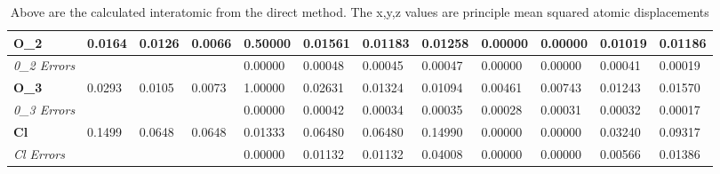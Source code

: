 \documentclass[]{scrartcl}
\begin{document}
\begin{table}[]
\begin{tabular}{|l|l|l|l|l|l|l|l|l|l|l|l|}
		\textbf{O\_2}                         & 0.0164                          & 0.0126                          & 0.0066                          & 0.50000                           & 0.01561                           & 0.01183                           & 0.01258                           & 0.00000                           & 0.00000                           & 0.01019                           & 0.01186                           \\ \hline
		\textit{0\_2 Errors}                           &                                 &                                 &                                 & 0.00000                           & 0.00048                           & 0.00045                           & 0.00047                           & 0.00000                           & 0.00000                           & 0.00041                           & 0.00019                           \\ \hline
		\textbf{O\_3}                         & 0.0293                          & 0.0105                          & 0.0073                          & 1.00000                           & 0.02631                           & 0.01324                           & 0.01094                           & 0.00461                           & 0.00743                           & 0.01243                           & 0.01570                           \\ \hline
		\textit{0\_3 Errors}                           &                                 &                                 &                                 & 0.00000                           & 0.00042                           & 0.00034                           & 0.00035                           & 0.00028                           & 0.00031                           & 0.00032                           & 0.00017                           \\ \hline
		\textbf{Cl}                         & 0.1499                          & 0.0648                          & 0.0648                          & 0.01333                           & 0.06480                           & 0.06480                           & 0.14990                           & 0.00000                           & 0.00000                           & 0.03240                           & 0.09317                           \\ \hline
		\textit{Cl Errors}
		&                                 &                                 &                                 & 0.00000                           & 0.01132                           & 0.01132                           & 0.04008                           & 0.00000                           & 0.00000                           & 0.00566                           & 0.01386                           \\ \hline
	\end{tabular}
	\caption{Above are the calculated interatomic from the direct method. The x,y,z values are principle mean squared atomic displacements}
\end{table}
\end{document}
